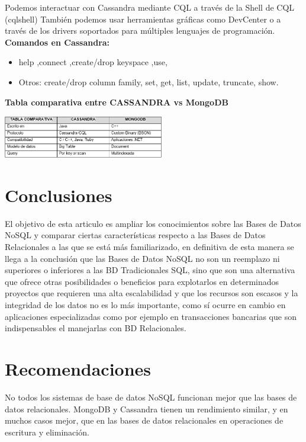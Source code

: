 \documentclass[twoside,twocolumn]{article}
\begin{document}
Podemos interactuar con Cassandra mediante CQL a través de la Shell de CQL (cqlshell) También podemos usar herramientas gráficas como DevCenter o a través de los drivers soportados para múltiples lenguajes de programación.
\\

\textbf{Comandos en Cassandra:}\\


\begin{itemize}
    \item help ,connect ,create/drop keyspace ,use, 
    \item Otros: create/drop column family, set, get, list, update, truncate, show.
\end{itemize}


\textbf{Tabla comparativa entre CASSANDRA vs MongoDB}\\

\begin{center}
	\includegraphics[width=7cm]{./img/4.png} 
\end{center}

\section{Conclusiones}
El objetivo de esta articulo es ampliar los conocimientos sobre las Bases de Datos NoSQL y comparar ciertas características respecto a las Bases de Datos Relacionales a las que se está más familiarizado, en definitiva de esta manera se llega a la conclusión que las Bases de Datos NoSQL no son un reemplazo ni superiores o inferiores a las BD Tradicionales SQL, sino que son una alternativa que ofrece otras posibilidades o beneficios para explotarlos en determinados proyectos que requieren una alta escalabilidad y que los recursos son escasos y la integridad de los datos no es lo más importante, como sí ocurre en cambio en aplicaciones especializadas como por ejemplo en transacciones bancarias que son indispensables el manejarlas con BD Relacionales.\\

\section{Recomendaciones}
No todos los sistemas de base de datos NoSQL funcionan mejor que las bases de datos relacionales. MongoDB y Cassandra tienen un rendimiento similar, y en muchos casos mejor, que en las bases de datos relacionales en operaciones de escritura y eliminación.\\
\end{document}
